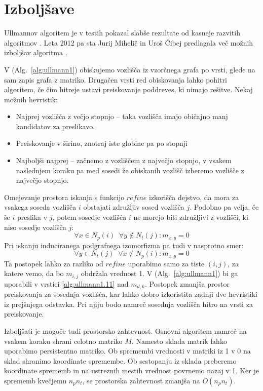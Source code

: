 \documentclass[a4paper, 12pt, ]{book}
\newcommand{\refalg}[1]{(Alg.~\ref{#1})}
\begin{document}
	\section{Izboljšave}
	\label{ull_imp}
	Ullmannov algoritem je v testih pokazal slabše rezultate od kasneje razvitih algoritmov \cite{vf2_2}. Leta 2012 pa sta Jurij Mihelič in Uroš Čibej predlagala
	več možnih izboljšav algoritma \cite{ull+}.
	
	V \refalg{alg:ullmann1} obiskujemo vozlišča iz vzorčnega grafa po vrsti, glede na sam zapis grafa z matriko. Drugačen vrsti red obiskovanja lahko
	pohitri algoritem, če čim hitreje ustavi preiskovanje poddreves, ki nimajo rešitve. Nekaj možnih hevristik:
	\begin{itemize}
	\item Najprej vozlišča z večjo stopnjo -- taka vozlišča imajo običajno manj kandidatov za preslikavo.
	\item Preiskovanje v širino, znotraj iste globine pa po stopnji
	\item Najboljši najprej -- začnemo z vozliščem z največjo stopnjo, v vsakem naslednjem koraku pa med sosedi že obiskanih vozlišč izberemo vozlišče z
	največjo stopnjo.
	\end{itemize}
	
	Omejevanje prostora iskanja s funkcijo $refine$ izkorišča dejstvo, da mora za vsakega soseda vozlišča $i$ obstajati združljiv sosed vozlišča $j$.
	Podobno pa velja, če še $i$ preslika v $j$, potem sosedje vozlišča $i$ ne morejo biti združljivi z vozlišči, ki niso sosedje vozlišča $j$:
	\begin{equation}
	\label{eq:ullmann_imp1}
	\forall x \in N_p(i) \;\; \forall y \not \in N_t(j) : m_{x,y} = 0
	\end{equation}
	Pri iskanju induciranega podgrafnega izomorfizma pa tudi v nasprotno smer:
	\begin{equation}
	\label{eq:ullmann_imp2}
	\forall y \in N_t(j) \;\; \forall x \not \in N_p(i) : m_{x,y} = 0
	\end{equation}
	Ta postopek lahko za razliko od $refine$ uporabimo samo za tiste $(i, j)$, za katere vemo, da bo $m_{i,j}$ obdržala vrednost 1. V \refalg{alg:ullmann1}
	bi ga uporabili v vrstici \ref{alg:ullmann1.11} nad $m_{d,k}$. Postopek zmanjša prostor preiskovanja za sosednja vozlišča, kar lahko dobro izkoristita 
	zadnji dve hevristiki iz prejšnjega odstavka. Pri njiju bodo namreč sosednja vozlišča hitro na vrsti za preiskovanje.
	
	Izboljšati je mogoče tudi prostorsko zahtevnost. Osnovni algoritem namreč na vsakem koraku shrani celotno matriko $M$. Namesto sklada matrik lahko
	uporabimo persistentno matriko. Ob spremembi vrednosti v matriki iz 1 v 0 na sklad shranimo koordinate spremembe. Ob sestopanju iz sklada
	preberemo koordinate sprememb in na ustreznih mestih vrednost povrnemo nazaj v 1. Ker je sprememb kvečjemu $n_p n_t$, se prostorska
	zahtevnost zmanjša na $O(n_p n_t)$.
\end{document}
